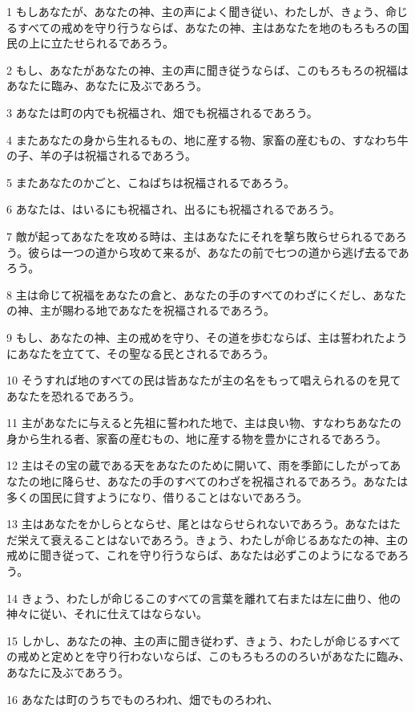 \par 1 もしあなたが、あなたの神、主の声によく聞き従い、わたしが、きょう、命じるすべての戒めを守り行うならば、あなたの神、主はあなたを地のもろもろの国民の上に立たせられるであろう。
\par 2 もし、あなたがあなたの神、主の声に聞き従うならば、このもろもろの祝福はあなたに臨み、あなたに及ぶであろう。
\par 3 あなたは町の内でも祝福され、畑でも祝福されるであろう。
\par 4 またあなたの身から生れるもの、地に産する物、家畜の産むもの、すなわち牛の子、羊の子は祝福されるであろう。
\par 5 またあなたのかごと、こねばちは祝福されるであろう。
\par 6 あなたは、はいるにも祝福され、出るにも祝福されるであろう。
\par 7 敵が起ってあなたを攻める時は、主はあなたにそれを撃ち敗らせられるであろう。彼らは一つの道から攻めて来るが、あなたの前で七つの道から逃げ去るであろう。
\par 8 主は命じて祝福をあなたの倉と、あなたの手のすべてのわざにくだし、あなたの神、主が賜わる地であなたを祝福されるであろう。
\par 9 もし、あなたの神、主の戒めを守り、その道を歩むならば、主は誓われたようにあなたを立てて、その聖なる民とされるであろう。
\par 10 そうすれば地のすべての民は皆あなたが主の名をもって唱えられるのを見てあなたを恐れるであろう。
\par 11 主があなたに与えると先祖に誓われた地で、主は良い物、すなわちあなたの身から生れる者、家畜の産むもの、地に産する物を豊かにされるであろう。
\par 12 主はその宝の蔵である天をあなたのために開いて、雨を季節にしたがってあなたの地に降らせ、あなたの手のすべてのわざを祝福されるであろう。あなたは多くの国民に貸すようになり、借りることはないであろう。
\par 13 主はあなたをかしらとならせ、尾とはならせられないであろう。あなたはただ栄えて衰えることはないであろう。きょう、わたしが命じるあなたの神、主の戒めに聞き従って、これを守り行うならば、あなたは必ずこのようになるであろう。
\par 14 きょう、わたしが命じるこのすべての言葉を離れて右または左に曲り、他の神々に従い、それに仕えてはならない。
\par 15 しかし、あなたの神、主の声に聞き従わず、きょう、わたしが命じるすべての戒めと定めとを守り行わないならば、このもろもろののろいがあなたに臨み、あなたに及ぶであろう。
\par 16 あなたは町のうちでものろわれ、畑でものろわれ、

